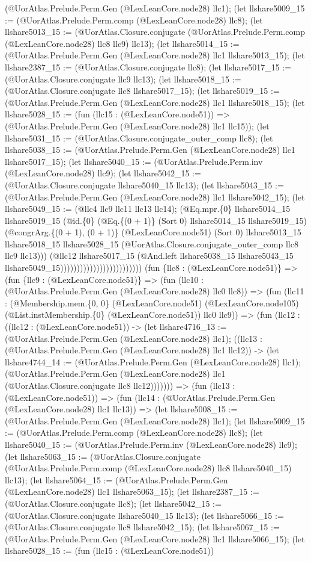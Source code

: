 \documentclass[11pt]{article}
\begin{document}
(@UorAtlas.Prelude.Perm.Gen (@LexLeanCore.node28) llc1); (let llshare5009\_15 := (@UorAtlas.Prelude.Perm.comp (@LexLeanCore.node28) llc8); (let llshare5013\_15 := (@UorAtlas.Closure.conjugate (@UorAtlas.Prelude.Perm.comp (@LexLeanCore.node28) llc8 llc9) llc13); (let llshare5014\_15 := (@UorAtlas.Prelude.Perm.Gen (@LexLeanCore.node28) llc1 llshare5013\_15); (let llshare2387\_15 := (@UorAtlas.Closure.conjugate llc8); (let llshare5017\_15 := (@UorAtlas.Closure.conjugate llc9 llc13); (let llshare5018\_15 := (@UorAtlas.Closure.conjugate llc8 llshare5017\_15); (let llshare5019\_15 := (@UorAtlas.Prelude.Perm.Gen (@LexLeanCore.node28) llc1 llshare5018\_15); (let llshare5028\_15 := (fun (llc15 : (@LexLeanCore.node51)) => (@UorAtlas.Prelude.Perm.Gen (@LexLeanCore.node28) llc1 llc15)); (let llshare5031\_15 := (@UorAtlas.Closure.conjugate\_outer\_comp llc8); (let llshare5038\_15 := (@UorAtlas.Prelude.Perm.Gen (@LexLeanCore.node28) llc1 llshare5017\_15); (let llshare5040\_15 := (@UorAtlas.Prelude.Perm.inv (@LexLeanCore.node28) llc9); (let llshare5042\_15 := (@UorAtlas.Closure.conjugate llshare5040\_15 llc13); (let llshare5043\_15 := (@UorAtlas.Prelude.Perm.Gen (@LexLeanCore.node28) llc1 llshare5042\_15); (let llshare5049\_15 := (@llc4 llc9 llc11 llc13 llc14); (@Eq.mpr.\{0\} llshare5014\_15 llshare5019\_15 (@id.\{0\} (@Eq.\{(0 + 1)\} (Sort 0) llshare5014\_15 llshare5019\_15) (@congrArg.\{(0 + 1), (0 + 1)\} (@LexLeanCore.node51) (Sort 0) llshare5013\_15 llshare5018\_15 llshare5028\_15 (@UorAtlas.Closure.conjugate\_outer\_comp llc8 llc9 llc13))) (@llc12 llshare5017\_15 (@And.left llshare5038\_15 llshare5043\_15 llshare5049\_15))))))))))))))))))))))))) (fun \{llc8 : (@LexLeanCore.node51)\} => (fun \{llc9 : (@LexLeanCore.node51)\} => (fun (llc10 : (@UorAtlas.Prelude.Perm.Gen (@LexLeanCore.node28) llc0 llc8)) => (fun (llc11 : (@Membership.mem.\{0, 0\} (@LexLeanCore.node51) (@LexLeanCore.node105) (@List.instMembership.\{0\} (@LexLeanCore.node51)) llc0 llc9)) => (fun (llc12 : ((llc12 : (@LexLeanCore.node51)) -> (let llshare4716\_13 := (@UorAtlas.Prelude.Perm.Gen (@LexLeanCore.node28) llc1); ((llc13 : (@UorAtlas.Prelude.Perm.Gen (@LexLeanCore.node28) llc1 llc12)) -> (let llshare4744\_14 := (@UorAtlas.Prelude.Perm.Gen (@LexLeanCore.node28) llc1); (@UorAtlas.Prelude.Perm.Gen (@LexLeanCore.node28) llc1 (@UorAtlas.Closure.conjugate llc8 llc12))))))) => (fun (llc13 : (@LexLeanCore.node51)) => (fun (llc14 : (@UorAtlas.Prelude.Perm.Gen (@LexLeanCore.node28) llc1 llc13)) => (let llshare5008\_15 := (@UorAtlas.Prelude.Perm.Gen (@LexLeanCore.node28) llc1); (let llshare5009\_15 := (@UorAtlas.Prelude.Perm.comp (@LexLeanCore.node28) llc8); (let llshare5040\_15 := (@UorAtlas.Prelude.Perm.inv (@LexLeanCore.node28) llc9); (let llshare5063\_15 := (@UorAtlas.Closure.conjugate (@UorAtlas.Prelude.Perm.comp (@LexLeanCore.node28) llc8 llshare5040\_15) llc13); (let llshare5064\_15 := (@UorAtlas.Prelude.Perm.Gen (@LexLeanCore.node28) llc1 llshare5063\_15); (let llshare2387\_15 := (@UorAtlas.Closure.conjugate llc8); (let llshare5042\_15 := (@UorAtlas.Closure.conjugate llshare5040\_15 llc13); (let llshare5066\_15 := (@UorAtlas.Closure.conjugate llc8 llshare5042\_15); (let llshare5067\_15 := (@UorAtlas.Prelude.Perm.Gen (@LexLeanCore.node28) llc1 llshare5066\_15); (let llshare5028\_15 := (fun (llc15 : (@LexLeanCore.node51)) 
\end{document}

